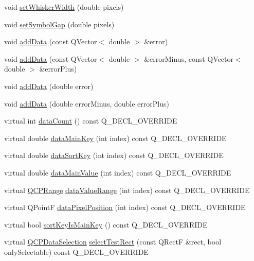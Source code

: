 \begin{DoxyCompactItemize}
\item 
void \hyperlink{classQCPErrorBars_ad05f6ff9e46c6047f1cd2459744b7b59}{set\+Whisker\+Width} (double pixels)
\item 
void \hyperlink{classQCPErrorBars_a280ee8d863d8a2630c309701d019b3de}{set\+Symbol\+Gap} (double pixels)
\item 
void \hyperlink{classQCPErrorBars_aae296ad9817b3fa418db284af81cecf8}{add\+Data} (const Q\+Vector$<$ double $>$ \&error)
\item 
void \hyperlink{classQCPErrorBars_a2135cf41d7925a3dcdadd4eb03fd3eb6}{add\+Data} (const Q\+Vector$<$ double $>$ \&error\+Minus, const Q\+Vector$<$ double $>$ \&error\+Plus)
\item 
void \hyperlink{classQCPErrorBars_a39ef73b0e61941fc4064fd3a5224c72a}{add\+Data} (double error)
\item 
void \hyperlink{classQCPErrorBars_a1833c5de9c2fe2952b977505d9f27cd1}{add\+Data} (double error\+Minus, double error\+Plus)
\item 
virtual int \hyperlink{classQCPErrorBars_a18b797c62f2af000b926e52eb46d97c7}{data\+Count} () const Q\+\_\+\+D\+E\+C\+L\+\_\+\+O\+V\+E\+R\+R\+I\+DE
\item 
virtual double \hyperlink{classQCPErrorBars_a7cba420078adc523efa59fb8c6ca23e0}{data\+Main\+Key} (int index) const Q\+\_\+\+D\+E\+C\+L\+\_\+\+O\+V\+E\+R\+R\+I\+DE
\item 
virtual double \hyperlink{classQCPErrorBars_a3000a036124880a90c629d124c1cd1e2}{data\+Sort\+Key} (int index) const Q\+\_\+\+D\+E\+C\+L\+\_\+\+O\+V\+E\+R\+R\+I\+DE
\item 
virtual double \hyperlink{classQCPErrorBars_ae9f6c79c03147efb1a67742c55386dc8}{data\+Main\+Value} (int index) const Q\+\_\+\+D\+E\+C\+L\+\_\+\+O\+V\+E\+R\+R\+I\+DE
\item 
virtual \hyperlink{classQCPRange}{Q\+C\+P\+Range} \hyperlink{classQCPErrorBars_af71af55d929d832daf32e283b21e1f3e}{data\+Value\+Range} (int index) const Q\+\_\+\+D\+E\+C\+L\+\_\+\+O\+V\+E\+R\+R\+I\+DE
\item 
virtual Q\+PointF \hyperlink{classQCPErrorBars_ae79fed6566f1912a97344b20b35faac1}{data\+Pixel\+Position} (int index) const Q\+\_\+\+D\+E\+C\+L\+\_\+\+O\+V\+E\+R\+R\+I\+DE
\item 
virtual bool \hyperlink{classQCPErrorBars_af75958b95d9b9c7edfd9851c1d123850}{sort\+Key\+Is\+Main\+Key} () const Q\+\_\+\+D\+E\+C\+L\+\_\+\+O\+V\+E\+R\+R\+I\+DE
\item 
virtual \hyperlink{classQCPDataSelection}{Q\+C\+P\+Data\+Selection} \hyperlink{classQCPErrorBars_ad7c727736599dfb173f0952082e1a5b6}{select\+Test\+Rect} (const Q\+RectF \&rect, bool only\+Selectable) const Q\+\_\+\+D\+E\+C\+L\+\_\+\+O\+V\+E\+R\+R\+I\+DE

\end{DoxyCompactItemize}
